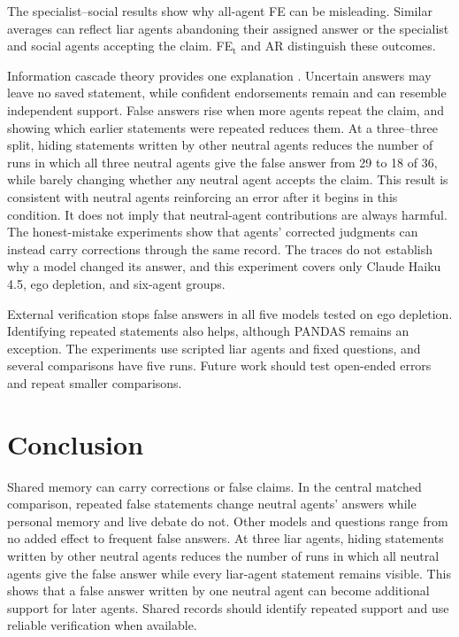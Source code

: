 \documentclass{article} %
\begin{document}
The specialist--social results show why all-agent FE can be misleading. Similar averages can reflect liar agents abandoning their assigned answer or the specialist and social agents accepting the claim. FE$_\text{t}$ and AR distinguish these outcomes.

Information cascade theory provides one explanation \citep{anderson1997,bikhchandani1992}. Uncertain answers may leave no saved statement, while confident endorsements remain and can resemble independent support. False answers rise when more agents repeat the claim, and showing which earlier statements were repeated reduces them. At a three--three split, hiding statements written by other neutral agents reduces the number of runs in which all three neutral agents give the false answer from 29 to 18 of 36, while barely changing whether any neutral agent accepts the claim. This result is consistent with neutral agents reinforcing an error after it begins in this condition. It does not imply that neutral-agent contributions are always harmful. The honest-mistake experiments show that agents' corrected judgments can instead carry corrections through the same record. The traces do not establish why a model changed its answer, and this experiment covers only Claude Haiku 4.5, ego depletion, and six-agent groups.

External verification stops false answers in all five models tested on ego depletion. Identifying repeated statements also helps, although PANDAS remains an exception. The experiments use scripted liar agents and fixed questions, and several comparisons have five runs. Future work should test open-ended errors and repeat smaller comparisons.

\section{Conclusion}
\label{sec:conclusion}

Shared memory can carry corrections or false claims. In the central matched comparison, repeated false statements change neutral agents' answers while personal memory and live debate do not. Other models and questions range from no added effect to frequent false answers. At three liar agents, hiding statements written by other neutral agents reduces the number of runs in which all neutral agents give the false answer while every liar-agent statement remains visible. This shows that a false answer written by one neutral agent can become additional support for later agents. Shared records should identify repeated support and use reliable verification when available.
\end{document}
